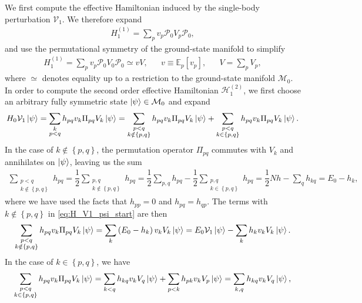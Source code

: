 \documentclass[nofootinbib,notitlepage,11pt]{revtex4-2}
\newcommand{\f}[2]{\dfrac{#1}{#2}} %
\newcommand{\p}[1]{\left(#1\right)} %
\renewcommand{\sp}[1]{\left[#1\right]} %
\renewcommand{\set}[1]{\left\{#1\right\}} %
\newcommand{\1}{\mathds{1}}
\renewcommand{\H}{\mathcal{H}}
\newcommand{\M}{\mathcal{M}}
\renewcommand{\P}{\mathcal{P}}
\newcommand{\V}{\mathcal{V}}
\newcommand{\EE}{\mathbb{E}}
\begin{document}
We first compute the effective Hamiltonian induced by the single-body
perturbation $\V_1$.  We therefore expand
\begin{align}
  H_1^{(1)} = \sum_p v_p \P_0 V_p \P_0,
\end{align}
and use the permutational symmetry of the ground-state manifold to
simplify
\begin{align}
  H_1^{(1)} =  \sum_p v_p \P_0 V_0 \P_0 \simeq v V,
  &&
  v \equiv \EE_p\sp{v_p},
  &&
  V = \sum_p V_p,
  \label{eq:H_1_1}
\end{align}
where $\simeq$ denotes equality up to a restriction to the
ground-state manifold $\M_0$.  In order to compute the second order
effective Hamiltonian $\H_1^{(2)}$, we first choose an arbitrary fully
symmetric state $\ket\psi\in\M_0$ and expand
\begin{align}
  H_0 \V_1 \ket\psi
  = \sum_{\substack{k\\p<q}} h_{pq} v_k \Pi_{pq} V_k \ket\psi
  = \sum_{\substack{p<q\\k\notin\set{p,q}}}
  h_{pq} v_k \Pi_{pq} V_k \ket\psi
  + \sum_{\substack{p<q\\k\in\set{p,q}}}
  h_{pq} v_k \Pi_{pq} V_k \ket\psi.
  \label{eq:H_V1_psi_start}
\end{align}
In the case of $k\notin\set{p,q}$, the permutation operator $\Pi_{pq}$
commutes with $V_k$ and annihilates on $\ket\psi$, leaving us the sum
\begin{align}
  \sum_{\substack{p<q\\k\notin\set{p,q}}} h_{pq}
  = \f12 \sum_{\substack{p,q\\k\notin\set{p,q}}} h_{pq}
  = \f12 \sum_{p,q} h_{pq}
  - \f12 \sum_{\substack{p,q\\k\in\set{p,q}}} h_{pq}
  = \f12 N h - \sum_q h_{kq}
  = E_0 - h_k,
\end{align}
where we have used the facts that $h_{pp}=0$ and $h_{pq}=h_{qp}$.  The
terms with $k\notin\set{p,q}$ in \eqref{eq:H_V1_psi_start} are then
\begin{align}
  \sum_{\substack{p<q\\k\notin\set{p,q}}}
  h_{pq} v_k \Pi_{pq} V_k \ket\psi
  = \sum_k \p{E_0 - h_k} v_k V_k \ket\psi
  = E_0 \V_1 \ket\psi - \sum_k h_k v_k V_k \ket\psi.
\end{align}
In the case of $k\in\set{p,q}$, we have
\begin{align}
  \sum_{\substack{p<q\\k\in\set{p,q}}}
  h_{pq} v_k \Pi_{pq} V_k \ket\psi
  = \sum_{k<q} h_{kq} v_k V_q \ket\psi
  + \sum_{p<k} h_{pk} v_k V_p \ket\psi
  = \sum_{k,q} h_{kq} v_k V_q \ket\psi,
\end{align}
\end{document}
